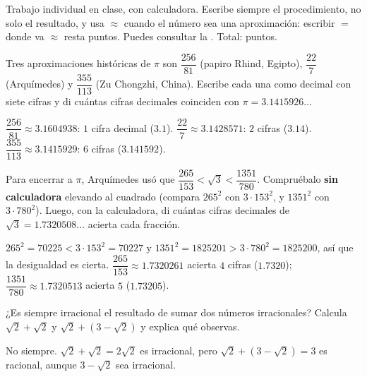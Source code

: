 \documentclass[11pt]{article}
\begin{document}
\encabezado

\begin{instrucciones}
Trabajo individual en clase, con calculadora. Escribe siempre el procedimiento, no solo
el resultado, y usa $\approx$ cuando el número sea una aproximación: escribir $=$ donde
va $\approx$ resta puntos. Puedes consultar la .
Total: \totalpuntos{} puntos.
\end{instrucciones}

\begin{preguntas}

\pregunta[1.5] Tres aproximaciones históricas de $\pi$ son $\dfrac{256}{81}$ (papiro
Rhind, Egipto), $\dfrac{22}{7}$ (Arquímedes) y $\dfrac{355}{113}$ (Zu Chongzhi, China).
Escribe cada una como decimal con siete cifras y di cuántas cifras decimales coinciden
con $\pi = \num{3,1415926}\ldots$
\begin{solucion}[4cm]
$\dfrac{256}{81} \approx \num{3,1604938}$: $1$ cifra decimal ($\num{3,1}$).
$\dfrac{22}{7} \approx \num{3,1428571}$: $2$ cifras ($\num{3,14}$).
$\dfrac{355}{113} \approx \num{3,1415929}$: $6$ cifras ($\num{3,141592}$).
\end{solucion}

\pregunta[1.5] Para encerrar a $\pi$, Arquímedes usó que
$\dfrac{265}{153} < \sqrt{3} < \dfrac{1351}{780}$. Compruébalo \textbf{sin calculadora}
elevando al cuadrado (compara $265^2$ con $3 \cdot 153^2$, y $1351^2$ con
$3 \cdot 780^2$). Luego, con la calculadora, di cuántas cifras decimales de
$\sqrt{3} = \num{1,7320508}\ldots$ acierta cada fracción.
\begin{solucion}[4.5cm]
$265^2 = \num{70225} < 3 \cdot 153^2 = \num{70227}$ y
$1351^2 = \num{1825201} > 3 \cdot 780^2 = \num{1825200}$, así que la desigualdad es
cierta. $\dfrac{265}{153} \approx \num{1,7320261}$ acierta $4$ cifras ($\num{1,7320}$);
$\dfrac{1351}{780} \approx \num{1,7320513}$ acierta $5$ ($\num{1,73205}$).
\end{solucion}

\pregunta[1] ¿Es siempre irracional el resultado de sumar dos números irracionales?
Calcula $\sqrt{2} + \sqrt{2}$ y $\sqrt{2} + \left(3 - \sqrt{2}\right)$ y explica qué
observas.
\begin{solucion}[3cm]
No siempre. $\sqrt{2} + \sqrt{2} = 2\sqrt{2}$ es irracional, pero
$\sqrt{2} + \left(3 - \sqrt{2}\right) = 3$ es racional, aunque $3 - \sqrt{2}$ sea
irracional.
\end{solucion}


\end{preguntas}
\end{document}
